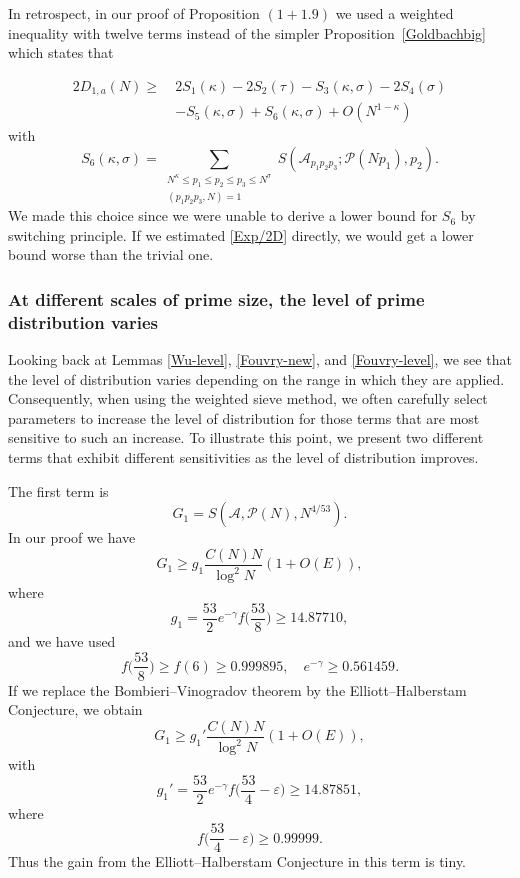 \documentclass[12pt, a4paper]{amsart}
\def\le{\leqslant}
\def\ge{\geqslant}
\theoremstyle{plain}
\theoremstyle{remark}
\numberwithin{equation}{section}
\begin{document}
In retrospect, in our proof of Proposition $(1+1.9)$ we used a weighted inequality with twelve terms instead of the simpler Proposition~\ref{Goldbachbig} which states that 

\begin{equation}\label{Exp/2D}
\begin{split}
2D_{1,a}(N)
\ge\ & 2S_1(\kappa)-2S_2(\tau)-S_3(\kappa,\sigma)-2S_4(\sigma)\\
&-S_5(\kappa,\sigma)+S_6(\kappa,\sigma)+O(N^{1-\kappa}) 
\end{split}
\end{equation}
with 
\[
S_6(\kappa,\sigma)= \sum_{\substack{N^\kappa \le p_1 \le p_2 \le p_3 \le N^\sigma \\ (p_1 p_2 p_3, N) = 1}} S(\mathscr{A}_{p_1 p_2 p_3}; \mathscr{P}(N p_1), p_2). 
\]
We made this choice since we were unable to derive a lower bound for \(S_6\) by switching principle. 
If we estimated \eqref{Exp/2D} directly, we would get a lower bound worse than the trivial one. 

\subsubsection{At different scales of prime size, the level of prime distribution varies} 
Looking back at Lemmas \ref{Wu-level}, \ref{Fouvry-new}, and \ref{Fouvry-level}, we see that the level of distribution varies depending on the range in which they are applied. 
Consequently, when using the weighted sieve method, we often carefully select parameters to increase the level of distribution for those terms that are most sensitive to such an increase. 
To illustrate this point, we present two different terms that exhibit different sensitivities as the level of distribution improves.

The first term is  
\[
G_1 =S(\mathscr{A},\mathscr{P}(N),N^{4/53}).
\]  
In our proof we have  
\begin{equation}
G_1\ge g_1\dfrac{C(N)N}{\log^2 N}(1+O(E)),
\end{equation}
where  
\begin{equation}
g_1=\dfrac{53}{2}e^{-\gamma}f\bigg(\dfrac{53}{8}\bigg)\ge 14.87710,
\end{equation}
and we have used
\begin{equation}
f\bigg(\dfrac{53}{8}\bigg)\ge f(6)\ge 0.999895, \quad e^{-\gamma}\ge 0.561459. 
\end{equation}
If we replace the Bombieri--Vinogradov theorem by the Elliott--Halberstam Conjecture, we obtain  
\begin{equation}
G_1\ge g_1'\dfrac{C(N)N}{\log^2 N}(1+O(E)),
\end{equation}
with  
\begin{equation}
g_1'=\dfrac{53}{2}e^{-\gamma}f\bigg(\dfrac{53}{4}-\varepsilon\bigg)\ge 14.87851,
\end{equation}
where  
$$
f\bigg(\dfrac{53}{4}-\varepsilon\bigg)\ge 0.99999. 
$$
Thus the gain from the Elliott--Halberstam Conjecture in this term is tiny.  
\end{document}
